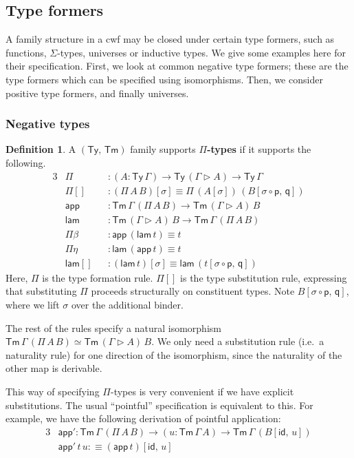 \documentclass[12pt,a4paper,twoside,openany]{book}
\theoremstyle{remark}
\theoremstyle{definition}
\newtheorem{mydefinition}{Definition}
\theoremstyle{theorem}
\newcommand{\ms}[1]{\mathsf{#1}}
\newcommand{\id}{\mathsf{id}}
\newcommand{\Tm}{\mathsf{Tm}}
\newcommand{\Ty}{\mathsf{Ty}}
\newcommand{\ext}{\triangleright}
\newcommand{\p}{\mathsf{p}}
\newcommand{\q}{\mathsf{q}}
\newcommand{\app}{\ms{app}}
\newcommand{\lam}{\ms{lam}}
\newcommand{\defn}{:\equiv}
\begin{document}
\subsection{Type formers}
A family structure in a cwf may be closed under certain type formers, such as
functions, $\Sigma$-types, universes or inductive types. We give some examples
here for their specification. First, we look at common negative type formers;
these are the type formers which can be specified using isomorphisms. Then, we
consider positive type formers, and finally universes.

\subsubsection{Negative types}

\begin{mydefinition}
A $(\Ty,\,\Tm)$ family supports \textbf{$\Pi$-types} if it supports the following.
\begingroup
\allowdisplaybreaks
\begin{alignat*}{3}
  &\Pi           &&: (A : \Ty\,\Gamma) \to \Ty\,(\Gamma\ext A) \to \Ty\,\Gamma\\
  &\Pi[]         &&: (\Pi\,A\,B)[\sigma] \equiv \Pi\,(A[\sigma])\,(B[\sigma\circ\p,\,\q])\\
  &\app          &&: \Tm\,\Gamma\,(\Pi\,A\,B) \to \Tm\,(\Gamma \ext A)\,B\\
  &\lam          &&: \Tm\,(\Gamma \ext A)\,B \to \Tm\,\Gamma\,(\Pi\,A\,B)\\
  &\Pi\beta      &&: \app\,(\lam\,t) \equiv t\\
  &\Pi\eta       &&: \lam\,(\app\,t) \equiv t\\
  &\lam[]        &&: (\lam\,t)[\sigma] \equiv \lam\,(t[\sigma\circ\p,\,\q])
\end{alignat*}
\endgroup
Here, $\Pi$ is the type formation rule. $\ms{\Pi[]}$ is the type substitution
rule, expressing that substituting $\Pi$ proceeds structurally on constituent
types.  Note $B[\sigma\circ\p,\,\q]$, where we lift $\sigma$ over the additional
binder.

The rest of the rules specify a natural isomorphism $\Tm\,\Gamma\,(\Pi\,A\,B)
\simeq \Tm\,(\Gamma \ext A)\,B$. We only need a substitution rule (i.e.\ a
naturality rule) for one direction of the isomorphism, since the naturality of
the other map is derivable.

This way of specifying $\Pi$-types is very convenient if we have explicit
substitutions. The usual ``pointful'' specification is equivalent to this. For
example, we have the following derivation of pointful application:
\begin{alignat*}{3}
  &\app' : \Tm\,\Gamma\,(\Pi\,A\,B) \to (u : \Tm\,\Gamma\,A) \to \Tm\,\Gamma\,(B[\id,\,u])\\
  &\app'\,t\,u \defn (\app\,t)[\id,\,u]
\end{alignat*}

\end{mydefinition}
\end{document}
